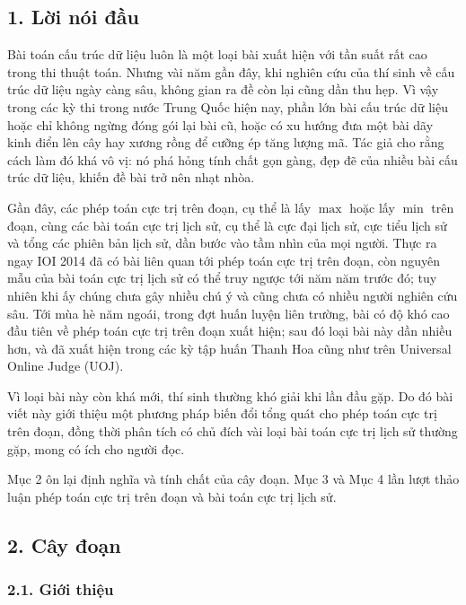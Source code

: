 \documentclass[11pt]{article}
\begin{document}
\subsection*{1. Lời nói đầu}

Bài toán cấu trúc dữ liệu luôn là một loại bài xuất hiện với tần suất rất cao
trong thi thuật toán. Nhưng vài năm gần đây, khi nghiên cứu của thí sinh về
cấu trúc dữ liệu ngày càng sâu, không gian ra đề còn lại cũng dần thu hẹp.
Vì vậy trong các kỳ thi trong nước Trung Quốc hiện nay, phần lớn bài cấu trúc
dữ liệu hoặc chỉ không ngừng đóng gói lại bài cũ, hoặc có xu hướng đưa một
bài dãy kinh điển lên cây hay xương rồng để cưỡng ép tăng lượng mã. Tác giả
cho rằng cách làm đó khá vô vị: nó phá hỏng tính chất gọn gàng, đẹp đẽ của
nhiều bài cấu trúc dữ liệu, khiến đề bài trở nên nhạt nhòa.

Gần đây, các phép toán cực trị trên đoạn, cụ thể là lấy \(\max\) hoặc lấy
\(\min\) trên đoạn, cùng các bài toán cực trị lịch sử, cụ thể là cực đại lịch
sử, cực tiểu lịch sử và tổng các phiên bản lịch sử, dần bước vào tầm nhìn của
mọi người. Thực ra ngay IOI 2014 đã có bài liên quan tới phép toán cực trị
trên đoạn, còn nguyên mẫu của bài toán cực trị lịch sử có thể truy ngược tới
năm năm trước đó; tuy nhiên khi ấy chúng chưa gây nhiều chú ý và cũng chưa có
nhiều người nghiên cứu sâu. Tới mùa hè năm ngoái, trong đợt huấn luyện liên
trường, bài có độ khó cao đầu tiên về phép toán cực trị trên đoạn xuất hiện;
sau đó loại bài này dần nhiều hơn, và đã xuất hiện trong các kỳ tập huấn Thanh
Hoa cũng như trên Universal Online Judge (UOJ).

Vì loại bài này còn khá mới, thí sinh thường khó giải khi lần đầu gặp. Do đó
bài viết này giới thiệu một phương pháp biến đổi tổng quát cho phép toán cực
trị trên đoạn, đồng thời phân tích có chủ đích vài loại bài toán cực trị lịch
sử thường gặp, mong có ích cho người đọc.

Mục 2 ôn lại định nghĩa và tính chất của cây đoạn. Mục 3 và Mục 4 lần lượt
thảo luận phép toán cực trị trên đoạn và bài toán cực trị lịch sử.

\subsection*{2. Cây đoạn}

\subsubsection*{2.1. Giới thiệu}
\end{document}

